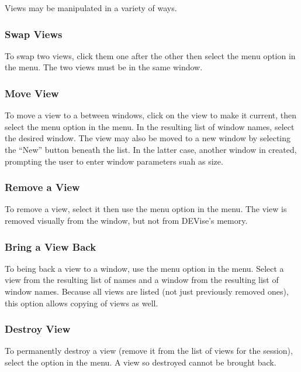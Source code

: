 Views may be manipulated in a variety of ways.

\subsubsection{Swap Views}

To swap two views, click them one after the other then select the  menu option in the  menu. The two views must be in the same
window.

\subsubsection{Move View}

To move a view to a between windows, click on the view to make it current, then
select the  menu option in the  menu. In the
resulting list of window names, select the desired window. The view may also be
moved to a new window by selecting the ``New'' button beneath the list. In the
latter case, another window in created, prompting the user to enter window
parameters suah as size.

\subsubsection{Remove a View}

To remove a view, select it then use the  menu option in the
 menu. The view is removed visually from the window, but not from
DEVise's memory.

\subsubsection{Bring a View Back}

To being back a view to a window, use the  menu option in
the  menu. Select a view from the resulting list of names and a
window from the resulting list of window names. Because all views are listed
(not just previously removed ones), this option allows copying of views as well.

\subsubsection{Destroy View}

To permanently destroy a view (remove it from the list of views for the
session), select the  option in the  menu. A view
so destroyed cannot be brought back.

